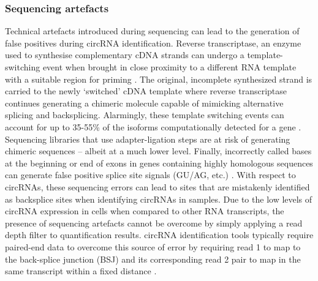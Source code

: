 \subsubsection{Sequencing artefacts}
Technical artefacts introduced during sequencing can lead to the generation of false positives during circRNA identification. Reverse transcriptase, an enzyme used to synthesise complementary cDNA strands can undergo a template-switching event when brought in close proximity to a different RNA template with a suitable region for priming \cite{Cocquet2006Jul}. The original, incomplete synthesized strand is carried to the newly `switched' cDNA template where reverse transcriptase continues generating a chimeric molecule capable of mimicking alternative splicing and backsplicing. Alarmingly, these template switching events can account for up to 35-55\% of the isoforms computationally detected for a gene \cite{Roy2015}. Sequencing libraries that use adapter-ligation steps are at risk of generating chimeric sequences -- albeit at a much lower level. Finally, incorrectly called bases at the beginning or end of exons in genes containing highly homologous sequences can generate false positive splice site signals (GU/AG, etc.) \cite{Salzman2014Jun}. With respect to circRNAs, these sequencing errors can lead to sites that are mistakenly identified as backsplice sites when identifying circRNAs in samples. Due to the low levels of circRNA expression in cells when compared to other RNA transcripts, the presence of sequencing artefacts cannot be overcome by simply applying a read depth filter to quantification results. circRNA identification tools typically require paired-end data to overcome this source of error by requiring read 1 to map to the back-splice junction (BSJ) and its corresponding read 2 pair to map in the same transcript within a fixed distance \cite{Salzman2012}.

